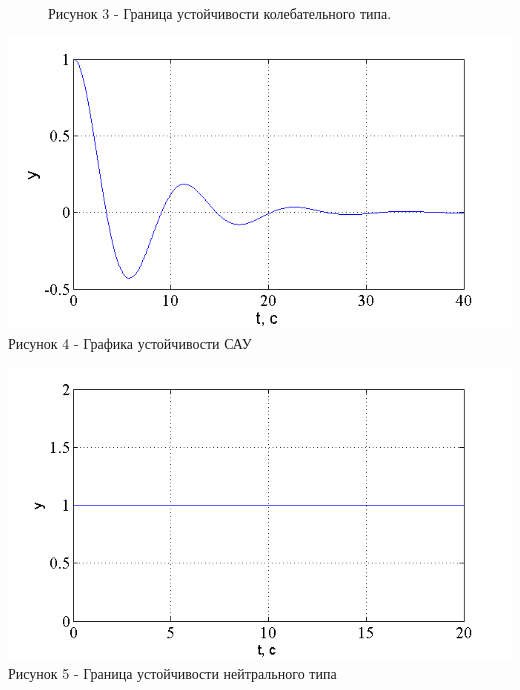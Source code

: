 \documentclass[a4paper, 12pt]{article}
\begin{document}
\begin{figure}[h]
	
	\\
	\centering Рисунок 3 - Граница устойчивости колебательного типа.
\end{figure}

\begin{center}
	\includegraphics[width=0.7\linewidth]{3}
	\\
\centering Рисунок 4 - Графика устойчивости САУ
	

\end{center}

\begin{center}
	\includegraphics[width=0.7\linewidth]{5}
	\\
	\centering Рисунок 5 - Граница устойчивости нейтрального типа
	
	
\end{center}
\end{document}

